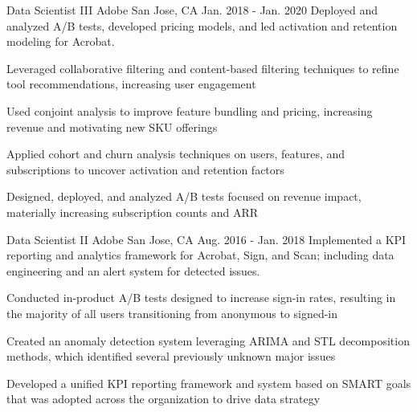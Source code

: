 \begin{cventries}
\cventry
    {Data Scientist III} %
    {Adobe} %
    {San Jose, CA} %
    {Jan. 2018 - Jan. 2020} %
    {Deployed and analyzed A/B tests, developed pricing models, and led activation and retention modeling for Acrobat.} %
    {
      \begin{cvitems} %
        \item {Leveraged collaborative filtering and content-based filtering techniques to refine tool recommendations, increasing user engagement}
        \item {Used conjoint analysis to improve feature bundling and pricing, increasing revenue and motivating new SKU offerings}
        \item {Applied cohort and churn analysis techniques on users, features, and subscriptions to uncover activation and retention factors}
        \item {Designed, deployed, and analyzed A/B tests focused on revenue impact, materially increasing subscription counts and ARR}
      \end{cvitems}
    }

\cventry
    {Data Scientist II} %
    {Adobe} %
    {San Jose, CA} %
    {Aug. 2016 - Jan. 2018} %
    {Implemented a KPI reporting and analytics framework for Acrobat, Sign, and Scan; including data engineering and an alert system for detected issues.} %
    {
      \begin{cvitems} %
        \item {Conducted in-product A/B tests designed to increase sign-in rates, resulting in the majority of all users transitioning from anonymous to signed-in}
        \item {Created an anomaly detection system leveraging ARIMA and STL decomposition methods, which identified several previously unknown major issues}
        \item {Developed a unified KPI reporting framework and system based on SMART goals that was adopted across the organization to drive data strategy}
      \end{cvitems}
    }

\end{cventries}
